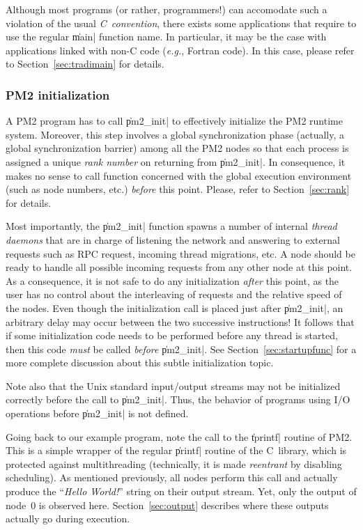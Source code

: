 Although most programs (or rather, programmers!) can accomodate such a
violation of the usual \emph{C~convention}, there exists some
applications that require to use the regular \|main| function name. In
particular, it may be the case with applications linked with non-C
code (\emph{e.g.}, Fortran code).  In this case, please refer to
Section~\ref{sec:tradimain} for details.

\subsubsection{PM2 initialization}

A PM2 program has to call \|pm2_init| to effectively initialize the
PM2 runtime system. Moreover, this step involves a global
synchronization phase (actually, a global synchronization barrier)
among all the PM2 nodes so that each process is assigned a unique
\emph{rank number} on returning from \|pm2_init|. In consequence, it
makes no sense to call function concerned with the global execution
environment (such as node numbers, etc.)  \emph{before} this point.
Please, refer to Section~\ref{sec:rank} for details.

Most importantly, the \|pm2_init| function spawns a number of internal
\emph{thread daemons} that are in charge of listening the network and
answering to external requests such as RPC request, incoming thread
migrations, etc. A node should be ready to handle all possible
incoming requests from any other node at this point. As a consequence,
it is not safe to do any initialization \emph{after} this point, as
the user has no control about the interleaving of requests and the
relative speed of the nodes. Even though the initialization call is
placed just after \|pm2_init|, an arbitrary delay may occur between
the two successive instructions! It follows that if some
initialization code needs to be performed before any thread is
started, then this code \emph{must} be called \emph{before}
\|pm2_init|.  See Section~\ref{sec:startupfunc} for a more complete
discussion about this subtle initialization topic.

Note also that the Unix standard input/output streams may not be
initialized correctly before the call to \|pm2_init|. Thus, the
behavior of programs using I/O operations before \|pm2_init| is not
defined.

Going back to our example program, note the call to the \|tprintf|
routine of PM2. This is a simple wrapper of the regular \|printf|
routine of the C~library, which is protected against multithreading
(technically, it is made \emph{reentrant} by disabling scheduling).
As mentioned previously, all nodes perform this call and actually
produce the ``\emph{Hello World!}'' string on their output stream.
Yet, only the output of node~0 is observed here.
Section~\ref{sec:output} describes where these outputs actually go
during execution.

